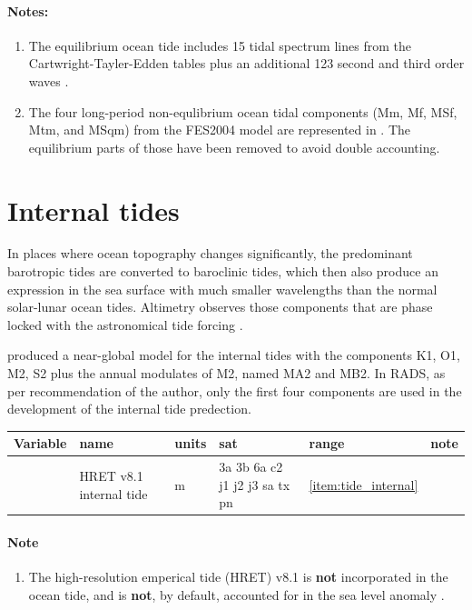 \documentclass[a4paper,11pt,openany,natbib,nomargin]{thesis}
\newenvironment{vartable}{
\begin{table}[ht]
\small
\begin{tabular}{lllllr}
\hline\hline
Variable & name & units & sat & range & note \\
\hline\hline
}{
\hline
\end{tabular}
\end{table}
}
\newenvironment{notes}[1][Notes:]{\FloatBarrier\paragraph{#1}\begin{enumerate}}{\end{enumerate}}
\begin{document}
\begin{notes}
As with other FES models  includes long-period non-equilibrium tides; specifically: Mf, Mm, Mtm, MSf, MSqm, Sa, and Ssa. This model is now the default tide model.
\label{item:tide_ocean_fes14}\label{item:tide_load_fes14}
\item The equilibrium ocean tide includes 15 tidal spectrum lines from the Cartwright-Tayler-Edden tables \citep{cartwright1971,cartwright1973} plus an additional 123 second and third order waves \citep{tamura1987}.\label{item:tide_equil}
\item The four long-period non-equlibrium ocean tidal components (Mm, Mf, MSf, Mtm, and MSqm) from the FES2004 model are represented in . The equilibrium parts of those have been removed to avoid double accounting.\label{item:tide_non_equil}
\end{notes}

\section{Internal tides}
In places where ocean topography changes significantly, the predominant barotropic tides are converted to baroclinic tides, which then also produce an expression in the sea surface with much smaller wavelengths than the normal solar-lunar ocean tides. Altimetry observes those components that are phase locked with the astronomical tide forcing \citep{ray2016}.

\citet{zaron2019} produced a near-global model for the internal tides with the components K1, O1, M2, S2 plus the annual modulates of M2, named MA2 and MB2. In RADS, as per recommendation of the author, only the first four components are used in the development of the internal tide predection.

\begin{vartable}
\var{tide_internal} & HRET v8.1 internal tide & m & 3a 3b 6a c2 j1 j2 j3 sa tx pn & \ref{item:tide_internal} \\
\end{vartable}

\begin{notes}[Note]
\item The high-resolution emperical tide (HRET) v8.1 \citep{zaron2019} is \textbf{not} incorporated in the ocean tide, and is \textbf{not}, by default, accounted for in the sea level anomaly .\label{item:tide_internal}
\end{notes}
\end{document}
